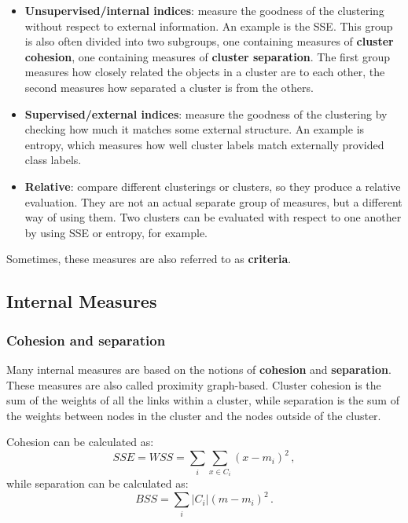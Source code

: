 \begin{itemize}
    \item \textbf{Unsupervised/internal indices}: measure the goodness of the clustering without respect to external information. An example is the SSE.
    This group is also often divided into two subgroups, one containing measures of \textbf{cluster cohesion}, one containing measures of \textbf{cluster separation}. The first group measures how closely related the objects in a cluster are to each other, the second measures how separated a cluster is from the others.

    \item \textbf{Supervised/external indices}: measure the goodness of the clustering by checking how much it matches some external structure. An example is entropy, which measures how well cluster labels match externally provided class labels.

    \item \textbf{Relative}: compare different clusterings or clusters, so they produce a relative evaluation. They are not an actual separate group of measures, but a different way of using them. Two clusters can be evaluated with respect to one another by using SSE or entropy, for example.
\end{itemize}

Sometimes, these measures are also referred to as \textbf{criteria}.

\subsection{Internal Measures}

\subsubsection{Cohesion and separation}

Many internal measures are based on the notions of \textbf{cohesion} and \textbf{separation}. These measures are also called proximity graph-based. Cluster cohesion is the sum of the weights of all the links within a cluster, while separation is the sum of the weights between nodes in the cluster and the nodes outside of the cluster.

Cohesion can be calculated as:
\begin{equation*}
    SSE = WSS = \sum_i \sum_{x \in C_i} (x-m_i)^2 \, ,
\end{equation*}
while separation can be calculated as:
\begin{equation*}
    BSS = \sum _i |C_i|(m-m_i)^2 \, .
\end{equation*}

